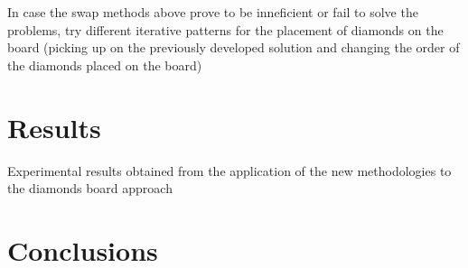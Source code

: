\documentclass{llncs}
\begin{document}
In case the swap methods above prove to be inneficient or fail to solve the problems, try different iterative patterns for the placement of diamonds on the board (picking up on the previously developed solution and changing the order of the diamonds placed on the board)

\section{Results}

Experimental results obtained from the application of the new methodologies to the diamonds board approach

\section{Conclusions}

%
%

\end{document}
